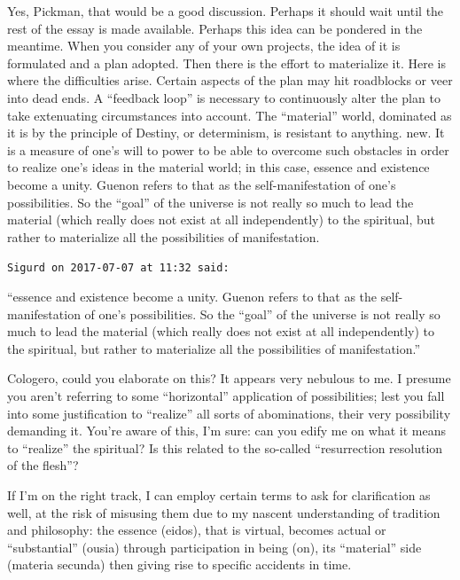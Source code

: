 \begin{footnotesize}
\begin{sffamily}
Yes, Pickman, that would be a good discussion. Perhaps it should wait until the rest of the essay is made available. Perhaps this idea can be pondered in the meantime. When you consider any of your own projects, the idea of it is formulated and a plan adopted. Then there is the effort to materialize it. Here is where the difficulties arise. Certain aspects of the plan may hit roadblocks or veer into dead ends. A ``feedback loop'' is necessary to continuously alter the plan to take extenuating circumstances into account. The ``material'' world, dominated as it is by the principle of Destiny, or determinism, is resistant to anything. new. It is a measure of one's will to power to be able to overcome such obstacles in order to realize one's ideas in the material world; in this case, essence and existence become a unity. Guenon refers to that as the self-manifestation of one's possibilities. So the ``goal'' of the universe is not really so much to lead the material (which really does not exist at all independently) to the spiritual, but rather to materialize all the possibilities of manifestation.

\hfill

\texttt{Sigurd on 2017-07-07 at 11:32 said:}

``essence and existence become a unity. Guenon refers to that as the self-manifestation of one's possibilities. So the ``goal'' of the universe is not really so much to lead the material (which really does not exist at all independently) to the spiritual, but rather to materialize all the possibilities of manifestation.''

Cologero, could you elaborate on this? It appears very nebulous to me. I presume you aren't referring to some ``horizontal'' application of possibilities; lest you fall into some justification to ``realize'' all sorts of abominations, their very possibility demanding it. You're aware of this, I'm sure: can you edify me on what it means to ``realize'' the spiritual? Is this related to the so-called ``resurrection resolution of the flesh''?

If I'm on the right track, I can employ certain terms to ask for clarification as well, at the risk of misusing them due to my nascent understanding of tradition and philosophy: the essence (eidos), that is virtual, becomes actual or ``substantial'' (ousia) through participation in being (on), its ``material'' side (materia secunda) then giving rise to specific accidents in time.

\hfill


\end{sffamily}
\end{footnotesize}
